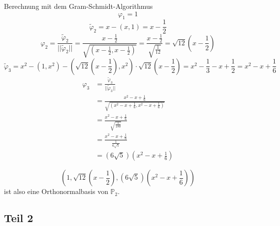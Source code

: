 \documentclass[10pt,a4paper]{article}
\begin{document}
Berechnung mit dem Gram-Schmidt-Algorithmus
\begin{equation}
  \varphi_{1} = 1
\end{equation}
\begin{equation}
  \tilde{\varphi}_{2} = x - (x, 1) = x - \frac{1}{2}
\end{equation}
\begin{equation}
  \varphi_{2} = \frac{\tilde{\varphi}_{2}}{||\tilde{\varphi}_{2}||} = \frac{x - \frac{1}{2}}{\sqrt{(x - \frac{1}{2}, x - \frac{1}{2})}} = \frac{x - \frac{1}{2}}{\sqrt{\frac{1}{12}}} = \sqrt{12}(x - \frac{1}{2})
\end{equation}
\begin{equation}
  \tilde{\varphi}_{3} = x^{2} - (1, x^{2}) - (\sqrt{12}(x - \frac{1}{2}), x^{2}) \cdot \sqrt{12}(x - \frac{1}{2}) = x^{2} - \frac{1}{3} - x + \frac{1}{2} = x^{2} - x + \frac{1}{6}
\end{equation}
\begin{align*}
  \varphi_{3} & = \frac{\tilde{\varphi}_{3}}{||\tilde{\varphi}_{3}||}\\
  & = \frac{x^{2} - x + \frac{1}{6}}{\sqrt{(x^{2} - x + \frac{1}{6}, x^{2} - x + \frac{1}{6})}}\\
  & = \frac{x^{2} - x + \frac{1}{6}}{\sqrt{\frac{1}{180}}}\\
  & = \frac{x^{2} - x + \frac{1}{6}}{\frac{1}{6 \sqrt{5}}}\\
  & = (6 \sqrt{5})(x^{2} - x + \frac{1}{6})
\end{align*}

\begin{equation}
  (1, \sqrt{12}(x - \frac{1}{2}), (6 \sqrt{5})(x^{2} - x + \frac{1}{6}))
\end{equation}
ist also eine Orthonormalbasis von $\mathbb{P}_{2}$.

\subsection{Teil 2}
\end{document}
